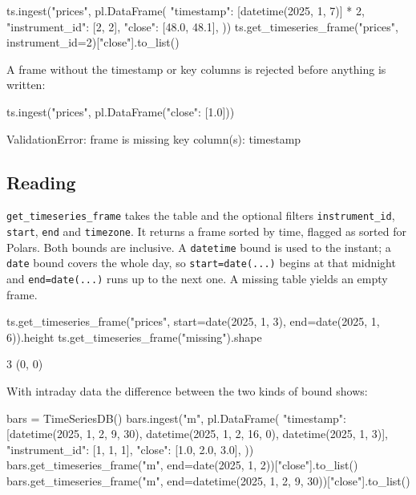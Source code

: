\documentclass[11pt,a4paper]{article}
\newcommand{\code}[1]{\texttt{#1}}
\begin{document}
\begin{python}
ts.ingest("prices", pl.DataFrame({
    "timestamp": [datetime(2025, 1, 7)] * 2,
    "instrument_id": [2, 2],
    "close": [48.0, 48.1],
}))
ts.get_timeseries_frame("prices", instrument_id=2)["close"].to_list()
\end{python}
\begin{console}
[50.0, 49.5, 48.1]
\end{console}

A frame without the timestamp or key columns is rejected before anything is written:

\begin{python}
ts.ingest("prices", pl.DataFrame({"close": [1.0]}))
\end{python}
\begin{console}
ValidationError: frame is missing key column(s): timestamp
\end{console}

\subsection{Reading}

\code{get\_timeseries\_frame} takes the table and the optional filters
\code{instrument\_id}, \code{start}, \code{end} and \code{timezone}. It returns a frame sorted by time, flagged as sorted for Polars. Both bounds
are inclusive. A \code{datetime} bound is used to the instant; a \code{date} bound covers
the whole day, so \code{start=date(...)} begins at that midnight and \code{end=date(...)}
runs up to the next one. A missing table yields an empty frame.

\begin{python}
ts.get_timeseries_frame("prices", start=date(2025, 1, 3), end=date(2025, 1, 6)).height
ts.get_timeseries_frame("missing").shape
\end{python}
\begin{console}
3
(0, 0)
\end{console}

With intraday data the difference between the two kinds of bound shows:

\begin{python}
bars = TimeSeriesDB()
bars.ingest("m", pl.DataFrame({
    "timestamp": [datetime(2025, 1, 2, 9, 30), datetime(2025, 1, 2, 16, 0), datetime(2025, 1, 3)],
    "instrument_id": [1, 1, 1],
    "close": [1.0, 2.0, 3.0],
}))
bars.get_timeseries_frame("m", end=date(2025, 1, 2))["close"].to_list()
bars.get_timeseries_frame("m", end=datetime(2025, 1, 2, 9, 30))["close"].to_list()
\end{python}
\begin{console}
[1.0, 2.0]
[1.0]
\end{console}
\end{document}
